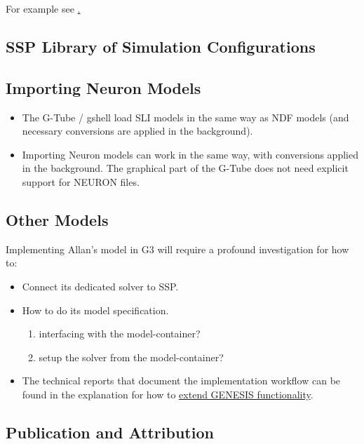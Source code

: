 \documentclass[12pt]{article}
\begin{document}
For example see
\href{../pub-purkinje-deschutter-kinetics/pub-purkinje-deschutter-kinetics.tex}.


\subsection{SSP Library of Simulation Configurations}

\subsection{Importing Neuron Models}

\begin{itemize}
\item The G-Tube / gshell load SLI models in the same way as NDF
  models (and necessary conversions are applied in the background).
\item Importing Neuron models can work in the same way, with
  conversions applied in the background.  The graphical part of the
  G-Tube does not need explicit support for NEURON files.
\end{itemize}

\subsection{Other Models}

Implementing Allan's model in G3 will require a profound investigation
for how to:
\begin{itemize}
\item Connect its dedicated solver to SSP.
\item How to do its model specification.
  \begin{enumerate}
  \item interfacing with the model-container?
  \item setup the solver from the model-container?
  \end{enumerate}
\item The technical reports that document the implementation workflow
  can be found in the explanation for how to
  \href{../genesis-extend-functionality/genesis-extend-functionality.tex}{extend
    GENESIS functionality}.
\end{itemize}


\subsection{Publication and Attribution}
\end{document}
